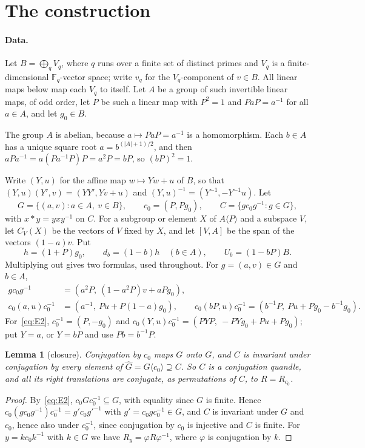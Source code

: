 \documentclass[11pt]{article}
\newtheorem{lemma}[theorem]{Lemma}
\newcommand{\F}{\mathbb{F}}
\begin{document}
\section{The construction}\label{sec:setting}

\paragraph{Data.} Let $B=\bigoplus_q V_q$, where $q$ runs over a finite set
of distinct primes and $V_q$ is a finite-dimensional $\F_q$-vector space;
write $v_q$ for the $V_q$-component of $v\in B$. All linear maps below map
each $V_q$ to itself. Let $A$ be a group of such invertible linear maps, of
odd order, let $P$ be such a linear map with $P^2=1$ and $PaP=a^{-1}$ for
all $a\in A$, and let $g_0\in B$.

The group $A$ is abelian, because $a\mapsto PaP=a^{-1}$ is a homomorphism.
Each $b\in A$ has a unique square root $a=b^{(|A|+1)/2}$, and then
$aPa^{-1}=a(Pa^{-1}P)P=a^2P=bP$, so $(bP)^2=1$.

Write $(Y,u)$ for the affine map $w\mapsto Yw+u$ of $B$, so that
$(Y,u)(Y',v)=(YY',Yv+u)$ and $(Y,u)^{-1}=(Y^{-1},-Y^{-1}u)$. Let
\[
G=\{(a,v):a\in A,\ v\in B\},\qquad c_0=(P,Pg_0),\qquad
C=\{gc_0g^{-1}:g\in G\},
\]
with $x*y=yxy^{-1}$ on $C$. For a subgroup or element $X$ of $A\langle
P\rangle$ and a subspace $V$, let $C_V(X)$ be the vectors of $V$ fixed by
$X$, and let $[V,A]$ be the span of the vectors $(1-a)v$. Put
\[
h=(1+P)g_0,\qquad d_b=(1-b)h\quad(b\in A),\qquad U_b=(1-bP)B.
\]
Multiplying out gives two formulas, used throughout. For $g=(a,v)\in G$
and $b\in A$,
\begin{align}
gc_0g^{-1}&=(a^2P,\ (1-a^2P)v+aPg_0),\label{eq:E1}\\
c_0(a,u)c_0^{-1}&=(a^{-1},\ Pu+P(1-a)g_0),\qquad
c_0(bP,u)c_0^{-1}=(b^{-1}P,\ Pu+Pg_0-b^{-1}g_0).\label{eq:E2}
\end{align}
For~\eqref{eq:E2}, $c_0^{-1}=(P,-g_0)$ and $c_0(Y,u)c_0^{-1}=(PYP,\
-PYg_0+Pu+Pg_0)$; put $Y=a$, or $Y=bP$ and use $Pb=b^{-1}P$.

\begin{lemma}[closure]\label{lem:closure}
Conjugation by $c_0$ maps $G$ onto $G$, and $C$ is invariant under
conjugation by every element of $\hat G=G\langle c_0\rangle\supseteq C$.
So $C$ is a conjugation quandle, and all its right translations are
conjugate, as permutations of $C$, to $R=R_{c_0}$.
\end{lemma}

\begin{proof}
By~\eqref{eq:E2}, $c_0Gc_0^{-1}\subseteq G$, with equality since $G$ is
finite. Hence $c_0(gc_0g^{-1})c_0^{-1}=g'c_0g'^{-1}$ with
$g'=c_0gc_0^{-1}\in G$, and $C$ is invariant under $G$ and $c_0$, hence
also under $c_0^{-1}$, since conjugation by $c_0$ is injective and $C$ is
finite. For $y=kc_0k^{-1}$ with $k\in G$ we have $R_y=\varphi
R\varphi^{-1}$, where $\varphi$ is conjugation by $k$.
\end{proof}
\end{document}
